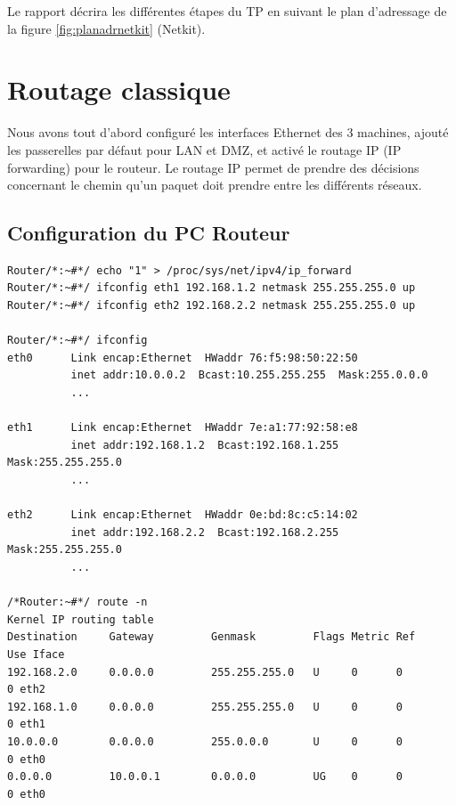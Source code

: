 \documentclass[frenchb, 11pt]{article}
\begin{document}
\begin{mdframed}[backgroundcolor=lightred, linecolor=darkred]
Le rapport décrira les différentes étapes du TP en suivant le plan d'adressage de la figure \ref{fig:planadrnetkit} (Netkit).
\end{mdframed}


\newpage

\section{Routage classique}
Nous avons tout d'abord configuré les interfaces Ethernet des 3 machines, ajouté les passerelles par défaut pour LAN et DMZ, et activé le routage IP (IP forwarding) pour le routeur. Le routage IP permet de prendre des décisions concernant le chemin qu'un paquet doit prendre entre les différents réseaux.

\subsection{Configuration du PC Routeur}
\begin{lstlisting}
Router/*:~#*/ echo "1" > /proc/sys/net/ipv4/ip_forward
Router/*:~#*/ ifconfig eth1 192.168.1.2 netmask 255.255.255.0 up
Router/*:~#*/ ifconfig eth2 192.168.2.2 netmask 255.255.255.0 up

Router/*:~#*/ ifconfig
eth0      Link encap:Ethernet  HWaddr 76:f5:98:50:22:50
          inet addr:10.0.0.2  Bcast:10.255.255.255  Mask:255.0.0.0
          ...

eth1      Link encap:Ethernet  HWaddr 7e:a1:77:92:58:e8
          inet addr:192.168.1.2  Bcast:192.168.1.255  Mask:255.255.255.0
          ...

eth2      Link encap:Ethernet  HWaddr 0e:bd:8c:c5:14:02
          inet addr:192.168.2.2  Bcast:192.168.2.255  Mask:255.255.255.0
          ...

/*Router:~#*/ route -n
Kernel IP routing table
Destination     Gateway         Genmask         Flags Metric Ref    Use Iface
192.168.2.0     0.0.0.0         255.255.255.0   U     0      0        0 eth2
192.168.1.0     0.0.0.0         255.255.255.0   U     0      0        0 eth1
10.0.0.0        0.0.0.0         255.0.0.0       U     0      0        0 eth0
0.0.0.0         10.0.0.1        0.0.0.0         UG    0      0        0 eth0
\end{lstlisting}
\hfill
\end{document}

